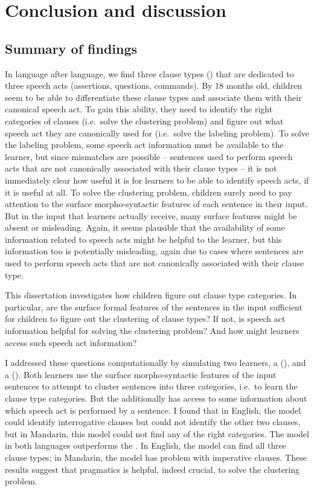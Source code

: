 \chapter{Conclusion and discussion}
\label{chap:discussion}

\section{Summary of findings}
In language after language, we find three clause types (\diis{}) that are dedicated to three speech acts (assertions, questions, commands). By 18 months old, children seem to be able to differentiate these clause types and associate them with their canonical speech act. To gain this ability, they need to identify the right categories of clauses (i.e.\ solve the clustering problem) and figure out what speech act they are canonically used for (i.e.\ solve the labeling problem). To solve the labeling problem, some speech act information must be available to the learner, but since mismatches are possible -- sentences used to perform speech acts that are not canonically associated with their clause types -- it is not immediately clear how useful it is for learners to be able to identify speech acts, if it is useful at all. To solve the clustering problem, children surely need to pay attention to the surface morpho-syntactic features of each sentence in their input. But in the input that learners actually receive, many surface features might be absent or misleading. Again, it seems plausible that the availability of some information related to speech acts might be helpful to the learner, but this information too is potentially misleading, again due to cases where sentences are used to perform speech acts that are not canonically associated with their clause type.

This dissertation investigates how children figure out clause type categories. In particular, are the surface formal features of the sentences in the input sufficient for children to figure out the clustering of clause types? If not, is speech act information helpful for solving the clustering problem? And how might learners access such speech act information?

I addressed these questions computationally by simulating two learners, a \distlearner{} (\dlearnerabbr{}), and a \praglearner{} (\plearnerabbr{}). Both learners use the surface morpho-syntactic features of the input sentences to attempt to cluster sentences into three categories, i.e.\ to learn the clause type categories. But the \plearnerabbr{} additionally has access to some information about which speech act is performed by a sentence. I found that in English, the \dlearnerabbr{} model could identify interrogative clauses but could not identify the other two clauses, but in Mandarin, this model could not find any of the right categories. The \plearnerabbr{} model in both languages outperforms the \dlearnerabbr{}. In English, the \plearnerabbr{} model can find all three clause types; in Mandarin, the model has problem with imperative clauses. These results suggest that pragmatics is helpful, indeed crucial, to solve the clustering problem. 


